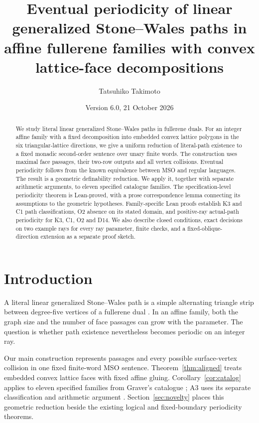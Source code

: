 \documentclass[11pt]{amsart}
\title[Affine fullerene families and eventual periodicity]{Eventual periodicity of linear generalized Stone--Wales paths in affine fullerene families with convex lattice-face decompositions}
\author{Tatsuhiko Takimoto}
\date{Version 6.0, 21 October 2026}
\theoremstyle{definition}\newtheorem{definition}{Definition}
\begin{document}
\begin{abstract}
We study literal linear generalized Stone--Wales paths in fullerene
duals. For an integer affine family with a fixed decomposition into
embedded convex lattice polygons in the six triangular-lattice
directions, we give a uniform reduction of literal-path existence to a
fixed monadic second-order sentence over unary finite words. The
construction uses maximal face passages, their two-row outputs and all
vertex collisions. Eventual periodicity follows from the known equivalence
between MSO and regular languages. The result is a geometric definability
reduction. We apply it, together with separate arithmetic arguments,
to eleven specified catalogue families. The specification-level
periodicity theorem is Lean-proved, with a prose correspondence lemma
connecting its assumptions to the geometric hypotheses. Family-specific
Lean proofs establish K3 and C1 path classifications, O2 absence on
its stated domain, and positive-ray actual-path periodicity for K3,
C1, O2 and D14. We also describe closed conditions, exact decisions on
two example rays for every ray parameter, finite checks, and a
fixed-oblique-direction extension as a separate proof sketch.
\end{abstract}
\maketitle

\section{Introduction}
A literal linear generalized Stone--Wales path is a simple alternating
triangle strip between degree-five vertices of a fullerene dual
\cite{BBS}. In an affine family, both the graph size and the number of
face passages can grow with the parameter. The question is whether
path existence nevertheless becomes periodic on an integer ray.

Our main construction represents passages and every possible
surface-vertex collision in one fixed finite-word MSO sentence.
Theorem~\ref{thm:aligned} treats embedded convex lattice faces with
fixed affine gluing. Corollary~\ref{cor:catalog} applies to eleven
specified families from Graver's catalogue \cite{Graver}; A3 uses its
separate classification and arithmetic argument \cite{A3}.
Section~\ref{sec:novelty} places this geometric reduction beside the
existing logical and fixed-boundary periodicity theorems.
\end{document}
